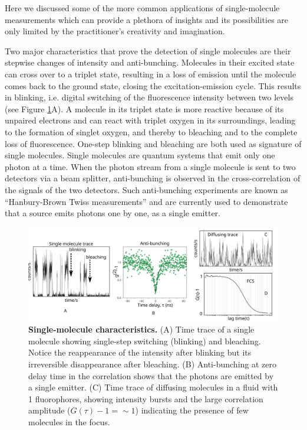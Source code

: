 Here we discussed some of the more common applications of single-molecule measurements which can provide a plethora of insights and its possibilities are only limited by the practitioner's creativity and imagination.

Two major characteristics that prove the detection of single molecules are their stepwise changes of intensity and anti-bunching.\cite{rasnik2006nonblinking,basch1992photon}
Molecules in their excited state can cross over to a triplet state, resulting in a loss of emission until the molecule comes back to the ground state, closing the excitation-emission cycle.
This results in blinking, i.e. digital switching of the fluorescence intensity between two levels (see Figure \ref{fig:SM_characteristics}A).
A molecule in its triplet state is more reactive because of its unpaired electrons and can react with triplet oxygen in its surroundings, leading to the formation of singlet oxygen, and thereby to bleaching and to the complete loss of fluorescence.
One-step blinking and bleaching are both used as signature of single molecules.
Single molecules are quantum systems that emit only one photon at a time. When the photon stream from a single molecule is sent to two detectors via a beam splitter, anti-bunching is observed in the cross-correlation of the signals of the two detectors.
Such anti-bunching experiments are known as ``Hanbury-Brown Twiss  measurements'' and are currently used to demonstrate that a source emits photons one by one, as a single emitter.\cite{brown1956correlation}
\begin{figure}
	\centering
	\includegraphics[width=\textwidth]{SM_characteristics}
	\caption{\textbf{Single-molecule characteristics.}
	(A) Time trace of a single molecule showing single-step switching (blinking) and bleaching.
	Notice the reappearance of the intensity after blinking but its irreversible disappearance after bleaching.
	(B) Anti-bunching at zero delay time in the correlation shows that the photons are emitted by a single emitter.\cite{chu2016a}
	(C) Time trace of diffusing molecules in a fluid with \SI{1}{\nM} fluorophores, showing intensity bursts and the large correlation amplitude ($G(\tau)-1={\sim}1$) indicating the presence of few molecules in the focus.}
	\label{fig:SM_characteristics}
\end{figure}

